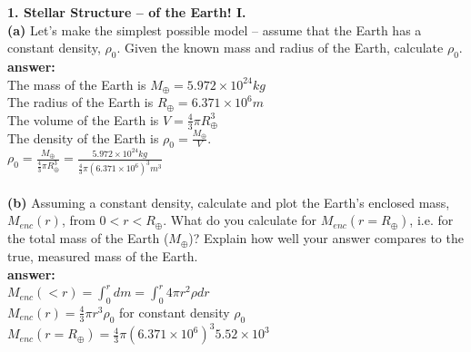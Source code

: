 \documentclass{article}
\begin{document}
    \textbf{1. Stellar Structure – of the Earth! I.}\\
    \textbf{(a)} Let’s make the simplest possible model – assume that the Earth has a constant density, $\rho_{0}$.
    Given the known mass and radius of the Earth, calculate $\rho_{0}$. \\
    \textbf{answer:} \\
    The mass of the Earth is $M_{\oplus} = 5.972 \times 10^{24} kg$ \\
    The radius of the Earth is $R_{\oplus} = 6.371 \times 10^{6} m$ \\
    The volume of the Earth is $V = \frac{4}{3}\pi R_{\oplus}^{3}$ \\
    The density of the Earth is $\rho_{0} = \frac{M_{\oplus}}{V}$. \\
    $\rho_{0} = \frac{M_{\oplus}}{\frac{4}{3}\pi R_{\oplus}^{3}} = \frac{5.972 \times 10^{24} kg}{\frac{4}{3}\pi (6.371 \times 10^{6})^{3} m^{3}}$ \\
     \\

    \textbf{(b)} Assuming a constant density, calculate and plot the Earth’s enclosed mass, $M_{enc}(r)$, from $0 < r < R_{\oplus}$.
    What do you calculate for $M_{enc}(r = R_{\oplus})$, i.e. for the total mass of the Earth ($M_{\oplus}$)? Explain how well
    your answer compares to the true, measured mass of the Earth. \\
    \textbf{answer:} \\
    $M_{enc}(<r) = \int_{0}^{r}dm = \int_{0}^{r}4\pi r^{2}\rho dr$ \\
    $M_{enc}(r) = \frac{4}{3}\pi r^{3}\rho_{0}$ for constant density $\rho_{0}$ \\
    $M_{enc}(r = R_{\oplus}) = \frac{4}{3}\pi (6.371 \times 10^{6})^{3} 5.52 \times 10^{3}$ \\
     \\
\end{document}
